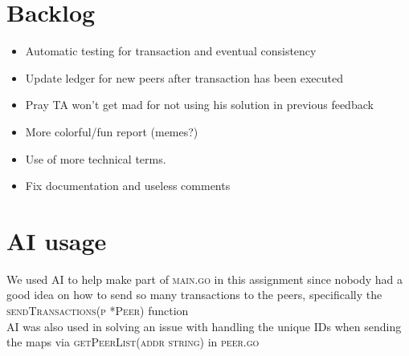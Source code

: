 \documentclass[12pt]{article}
\begin{document}
\section*{Backlog}
\begin{itemize}
    \item Automatic testing for transaction and eventual consistency
    \item Update ledger for new peers after transaction has been executed
    \item Pray TA won't get mad for not using his solution in previous feedback
    \item More colorful/fun report (memes?)
    \item Use of more technical terms.
    \item Fix documentation and useless comments
\end{itemize}

\section*{AI usage}
We used AI to help make part of \textsc{main.go} in this assignment since nobody had a good idea on how to send so many transactions to the peers, specifically the \textsc{sendTransactions(p *Peer)} function\\
AI was also used in solving an issue with handling the unique IDs when sending the maps via \textsc{getPeerList(addr string)} in \textsc{peer.go}

\printbibliography
\end{document}

